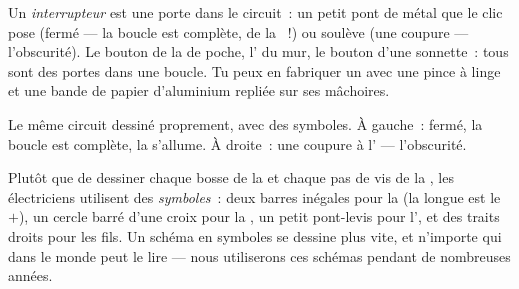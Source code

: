 \begin{example}[L'interrupteur]\label{ex:g3:first-electric-circuit:switch}
Un \emph{interrupteur} est une porte dans le
circuit~: un petit pont de métal que le clic pose (fermé --- la
boucle est complète, de la ~!) ou soulève (une coupure ---
l'obscurité). Le bouton de la  de poche, l' du mur,
le bouton d'une sonnette~: tous sont des portes dans une boucle. Tu
peux en fabriquer un avec une pince à linge et une bande de papier
d'aluminium repliée sur ses mâchoires.
\end{example}

\begin{omfigure}

{\small Le même circuit dessiné proprement, avec des symboles. À
gauche~:  fermé, la boucle est complète, la 
s'allume. À droite~: une coupure à l' --- l'obscurité.}
\end{omfigure}

\begin{remark}\label{rem:g3:first-electric-circuit:symbols}
Plutôt que de dessiner chaque bosse de la  et chaque pas de vis
de la , les électriciens utilisent des \emph{symboles}~: deux
barres inégales pour la  (la longue est le $+$), un cercle barré
d'une croix pour la , un petit pont-levis pour l',
et des traits droits pour les fils. Un schéma en symboles se dessine
plus vite, et n'importe qui dans le monde peut le lire --- nous
utiliserons ces schémas pendant de nombreuses années.
\end{remark}

